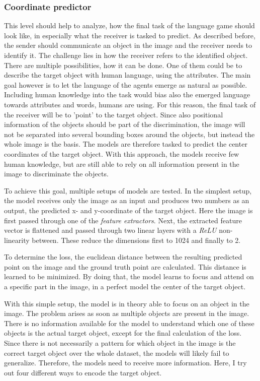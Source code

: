 \subsubsection{Coordinate predictor}

This level should help to analyze, how the final task of the language game should look like, in especially what the receiver is tasked to predict.
As described before, the sender should communicate an object in the image and the receiver needs to identify it.
The challenge lies in how the receiver refers to the identified object.
There are multiple possibilities, how it can be done.
One of them could be to describe the target object with human language, using the attributes.
The main goal however is to let the language of the agents emerge as natural as possible.
Including human knowledge into the task would bias also the emerged language towards attributes and words, humans are using.
For this reason, the final task of the receiver will be to 'point' to the target object.
Since also positional information of the objects should be part of the discrimination, the image will not be separated into several bounding boxes around the objects, but instead the whole image is the basis.
The models are therefore tasked to predict the center coordinates of the target object.
With this approach, the models receive few human knowledge, but are still able to rely on all information present in the image to discriminate the objects.

To achieve this goal, multiple setups of models are tested.
In the simplest setup, the model receives only the image  as an input and produces two numbers as an output, the predicted x- and y-coordinate of the target object.
Here the image is first passed through one of the \emph{feature extractors}.
Next, the extracted feature vector is flattened and passed through two linear layers with a \emph{ReLU} non-linearity between.
These reduce the dimensions first to 1024 and finally to 2.

To determine the loss, the euclidean distance between the resulting predicted point on the image and the ground truth point are calculated.
This distance is learned to be minimized.
By doing that, the model learns to focus and attend on a specific part in the image, in a perfect model the center of the target object.

With this simple setup, the model is in theory able to focus on an object in the image.
The problem arises as soon as multiple objects are present in the image.
There is no information available for the model to understand which one of these objects is the actual target object, except for the final calculation of the loss.
Since there is not necessarily a pattern for which object in the image is the correct target object over the whole dataset, the models will likely fail to generalize. 
Therefore, the models need to receive more information.
Here, I try out four different ways to encode the target object.


